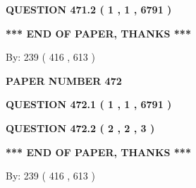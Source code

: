 \documentclass[12pt]{article}
\begin{document}
  
  
\vspace{0.2in}
  
{\textbf{\Large{QUESTION
471.2 
 ( 1 , 1 , 6791 )
}}}
  
  
   
   
 \vspace{0.2in}
 
   
   
   
   
\vspace{1.0in} 
{\textbf{\large{ *** END OF PAPER, THANKS *** }}} 
   
   
\hspace{1.0in} By: 
 239 ( 416 ,  613 )
   
   
   
   
\newpage 
\setcounter{page}{ 
   472001 } 
   
   
   
   
 {\textbf{ \Large{ PAPER NUMBER  472  }}}
   
   
\vspace{0.2in}
   
   
   
   
   
   
 \vspace{0.2in}
 
 
 
 
   
   
  
\vspace{0.2in}
  
{\textbf{\Large{QUESTION
472.1 
 ( 1 , 1 , 6791 )
}}}
  
  
  
\vspace{0.2in}
  
{\textbf{\Large{QUESTION
472.2 
 ( 2 , 2 , 3 )
}}}
  
  
   
   
 \vspace{0.2in}
 
   
   
   
   
\vspace{1.0in} 
{\textbf{\large{ *** END OF PAPER, THANKS *** }}} 
   
   
\hspace{1.0in} By: 
 239 ( 416 ,  613 )
   
   
   
\end{document}
